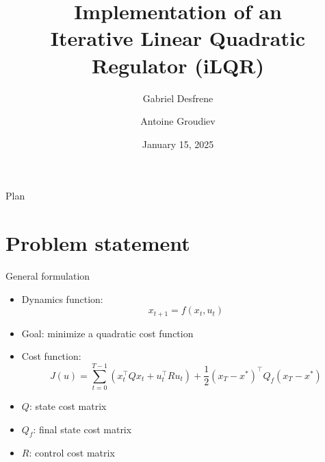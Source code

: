\documentclass[aspectratio=169]{beamer}
\title{\textbf{Implementation of an\\Iterative Linear Quadratic Regulator (iLQR)}}
\author{Gabriel Desfrene\and Antoine Groudiev}
\date{January 15, 2025}
\begin{document}
\frame{\titlepage}

\begin{frame}{Plan}
    \tableofcontents
\end{frame}

\section{Problem statement}
\begin{frame}{General formulation}
    \begin{itemize}
        \item Dynamics function:
              \begin{equation*}
                  x_{t+1} = f(x_t, u_t)
              \end{equation*}
        \item Goal: minimize a quadratic cost function
        \item Cost function:
              \begin{equation*}
                  J(u) = \sum_{t=0}^{T-1} \left(x_t^\top Q x_t + u_t^\top R u_t\right) + \frac{1}{2}(x_T-x^*)^\top Q_f (x_T-x^*)
              \end{equation*}
        \item $Q$: state cost matrix
        \item $Q_f$: final state cost matrix
        \item $R$: control cost matrix
    \end{itemize}
\end{frame}
\end{document}
